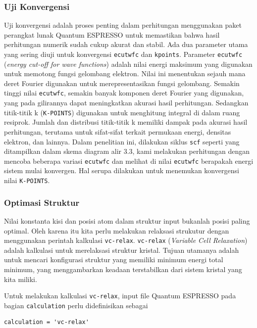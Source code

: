\subsubsection{Uji Konvergensi}
Uji konvergensi adalah proses penting dalam perhitungan menggunakan paket perangkat lunak Quantum ESPRESSO untuk memastikan bahwa hasil perhitungan numerik sudah cukup akurat dan stabil. Ada dua parameter utama yang sering diuji untuk konvergensi \texttt{ecutwfc} dan \texttt{kpoints}. Parameter \texttt{ecutwfc} (\textit{energy cut-off for wave functions}) adalah nilai energi maksimum yang digunakan untuk memotong fungsi gelombang elektron. Nilai ini menentukan sejauh mana deret Fourier digunakan untuk merepresentasikan fungsi gelombang. Semakin tinggi nilai \texttt{ecutwfc}, semakin banyak komponen deret Fourier yang digunakan, yang pada gilirannya dapat meningkatkan akurasi hasil perhitungan. Sedangkan titik-titik k (\texttt{K-POINTS}) digunakan untuk menghitung integral di dalam ruang resiprok. Jumlah dan distribusi titik-titik k memiliki dampak pada akurasi hasil perhitungan, terutama untuk sifat-sifat terkait permukaan energi, densitas elektron, dan lainnya. Dalam penelitian ini, dilakukan siklus \texttt{scf} seperti yang ditampilkan dalam skema diagram alir 3.3, kami melakukan perhitungan dengan mencoba beberapa variasi \texttt{ecutwfc} dan melihat di nilai \texttt{ecutwfc} berapakah energi sistem mulai konvergen. Hal serupa dilakukan untuk menemukan konvergensi nilai \texttt{K-POINTS}.


\subsubsection{Optimasi Struktur}
Nilai konstanta kisi dan posisi atom dalam struktur input bukanlah posisi paling optimal. Oleh karena itu kita perlu melakukan relaksasi strukutur dengan menggunakan perintah kalkulasi \texttt{vc-relax}. \texttt{vc-relax} (\textit{Variable Cell Relaxation}) adalah kalkulasi untuk merelaksasi struktur kristal. Tujuan utamanya adalah untuk mencari konfigurasi struktur yang memiliki minimum energi total minimum, yang menggambarkan keadaan terstabilkan dari sistem kristal yang kita miliki.

Untuk melakukan kalkulasi \texttt{vc-relax}, input file Quantum ESPRESSO pada bagian \texttt{calculation} perlu didefinisikan sebagai
\begin{lstlisting}
calculation = 'vc-relax'
\end{lstlisting}

